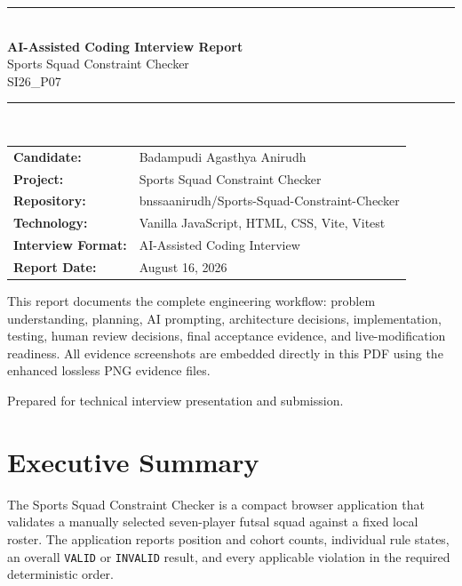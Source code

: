\documentclass[11pt,a4paper]{article}
\begin{document}
\begin{titlepage}
\centering
\vspace*{1.2cm}
{\color{techblue}\rule{\textwidth}{2pt}}\\[20pt]
{\Huge\bfseries\color{techblue} AI-Assisted Coding Interview Report}\\[10pt]
{\LARGE\color{techblue} Sports Squad Constraint Checker}\\[4pt]
{\Large\color{techblue} SI26\_P07}\\[20pt]
{\color{techblue}\rule{\textwidth}{2pt}}\\[28pt]
\begin{tabular}{ll}
  \textbf{Candidate:} & Badampudi Agasthya Anirudh \\
  \textbf{Project:} & Sports Squad Constraint Checker \\
  \textbf{Repository:} & bnssaanirudh/Sports-Squad-Constraint-Checker \\
  \textbf{Technology:} & Vanilla JavaScript, HTML, CSS, Vite, Vitest \\
  \textbf{Interview Format:} & AI-Assisted Coding Interview \\
  \textbf{Report Date:} & August 16, 2026 \\
\end{tabular}
\vfill
\begin{minipage}{0.88\textwidth}
\centering
\color{techgray}
This report documents the complete engineering workflow: problem understanding, planning, AI prompting, architecture decisions, implementation, testing, human review decisions, final acceptance evidence, and live-modification readiness. All evidence screenshots are embedded directly in this PDF using the enhanced lossless PNG evidence files.
\end{minipage}
\vfill
{\small\color{techgray}Prepared for technical interview presentation and submission.}
\end{titlepage}

\tableofcontents
\newpage

\section{Executive Summary}
The Sports Squad Constraint Checker is a compact browser application that validates a manually selected seven-player futsal squad against a fixed local roster. The application reports position and cohort counts, individual rule states, an overall \texttt{VALID} or \texttt{INVALID} result, and every applicable violation in the required deterministic order.
\end{document}
